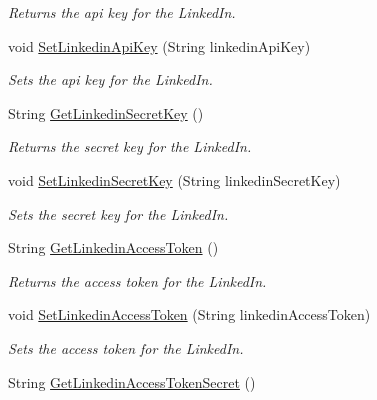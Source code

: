 \begin{DoxyCompactItemize}
\begin{DoxyCompactList}\small\item\em Returns the api key for the Linked\+In. \end{DoxyCompactList}\item 
void \hyperlink{classcom_1_1shephertz_1_1app42_1_1paas_1_1sdk_1_1windows_1_1social_1_1_social_a547ea2a394e94055d8af3faed3ad27b7}{Set\+Linkedin\+Api\+Key} (String linkedin\+Api\+Key)
\begin{DoxyCompactList}\small\item\em Sets the api key for the Linked\+In. \end{DoxyCompactList}\item 
String \hyperlink{classcom_1_1shephertz_1_1app42_1_1paas_1_1sdk_1_1windows_1_1social_1_1_social_a8056d1ed4072d7f74cb0412cd9e8bd5d}{Get\+Linkedin\+Secret\+Key} ()
\begin{DoxyCompactList}\small\item\em Returns the secret key for the Linked\+In. \end{DoxyCompactList}\item 
void \hyperlink{classcom_1_1shephertz_1_1app42_1_1paas_1_1sdk_1_1windows_1_1social_1_1_social_ad258c587486d386e5cb058644e0c1e66}{Set\+Linkedin\+Secret\+Key} (String linkedin\+Secret\+Key)
\begin{DoxyCompactList}\small\item\em Sets the secret key for the Linked\+In. \end{DoxyCompactList}\item 
String \hyperlink{classcom_1_1shephertz_1_1app42_1_1paas_1_1sdk_1_1windows_1_1social_1_1_social_af3023cb2ed4c0f4976f32006fdff8b4c}{Get\+Linkedin\+Access\+Token} ()
\begin{DoxyCompactList}\small\item\em Returns the access token for the Linked\+In. \end{DoxyCompactList}\item 
void \hyperlink{classcom_1_1shephertz_1_1app42_1_1paas_1_1sdk_1_1windows_1_1social_1_1_social_a3779ddd649ef056f14dc81672983b02e}{Set\+Linkedin\+Access\+Token} (String linkedin\+Access\+Token)
\begin{DoxyCompactList}\small\item\em Sets the access token for the Linked\+In. \end{DoxyCompactList}\item 
String \hyperlink{classcom_1_1shephertz_1_1app42_1_1paas_1_1sdk_1_1windows_1_1social_1_1_social_a0bc3b7c112cb68cdbfcc194fe08e37e7}{Get\+Linkedin\+Access\+Token\+Secret} ()

\end{DoxyCompactItemize}
